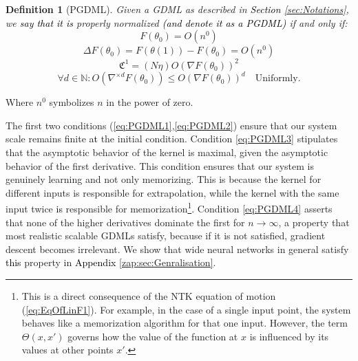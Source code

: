 \documentclass{article} %
\newtheorem{definition}{Definition}[section]
\begin{document}
\begin{definition}[PGDML]
\label{def:PGDML}
\textup{
Given a GDML as described in \textcolor{black}{Section} \ref{sec:Notations}, we \textcolor{black}{say that it is} properly normalized \textcolor{black}{(and denote it as a PGDML)} if and only if:
\begin{equation}
F\left(\theta_0\right)= O\left(n^0\right)
\label{eq:PGDML1}
\end{equation}
\begin{equation}
\Delta F\left(\theta_{0}\right)
=
F\left(\theta\left(1\right)\right)-F\left(\theta_{0}\right)
=
O\left(n^{0}\right)
\label{eq:PGDML2}
\end{equation}
\begin{equation}
\mathfrak{C}^{1}=\left(N\eta\right)O\left(\nabla F\left(\theta_{0}\right)\right)^{2}
\label{eq:PGDML3}
\end{equation}
\begin{equation}
\forall
d\in\mathbb{N}:
O\left(\nabla^{\times d}F\left(\theta_{0}\right)\right)
\leq 
O\left(\nabla F\left(\theta_{0}\right)\right)^{d}\quad\text{Uniformly.} 
\label{eq:PGDML4}
\end{equation}
}
\end{definition}
Where $n^{0}$ symbolizes $n$ in the power of zero.

The first two conditions (\ref{eq:PGDML1},\ref{eq:PGDML2}) ensure that our system scale remains finite \textcolor{black}{at} the initial condition. Condition \ref{eq:PGDML3} stipulates that the asymptotic behavior of the kernel is maximal, given the asymptotic behavior of the first derivative. This condition ensures that our system is genuinely learning and not only memorizing. This is because the kernel for different inputs is responsible for extrapolation, while the kernel with the same input twice \textcolor{black}{is} responsible for memorization\footnote{This is a direct consequence of the NTK equation of motion (\ref{eq:EqOfLinF1}). For example, in the case of a single input point, the system behaves like a memorization algorithm for that one input. However, the term $\Theta(x,x')$ governs how the value of the function at $x$ is influenced by its values at other points $x'$.}. Condition \ref{eq:PGDML4} asserts that none of the higher derivatives dominate the first for \(n\rightarrow\infty\), a property that most realistic scalable GDMLs satisfy, because if it is not satisfied, gradient descent becomes irrelevant. We show that wide neural networks in general satisfy \textcolor{black}{this} property in \textcolor{black}{Appendix} \ref{zap:sec:Genralisation}.  
\end{document}
